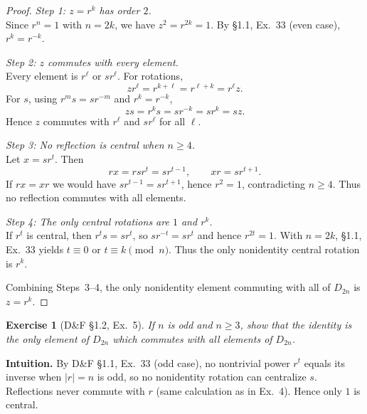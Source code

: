 \documentclass[12pt]{article}
\newtheorem{exercise}[theorem]{Exercise}
\theoremstyle{definition}
\begin{document}
\dotfill

\begin{proof}
\noindent\emph{Step 1: $z=r^{k}$ has order $2$.}\\

\noindent
Since $r^{n}=1$ with $n=2k$, we have $z^{2}=r^{2k}=1$. By §1.1, Ex.~33 (even case), $r^{k}=r^{-k}$.

\dotfill

\noindent\emph{Step 2: $z$ commutes with every element.}\\

\noindent
Every element is $r^{\ell}$ or $sr^{\ell}$. For rotations,
\[
zr^{\ell}=r^{k+\ell}=r^{\ell+k}=r^{\ell}z.
\]
For $s$, using $r^{m}s=sr^{-m}$ and $r^{k}=r^{-k}$,
\[
zs=r^{k}s=sr^{-k}=sr^{k}=sz.
\]
Hence $z$ commutes with $r^{\ell}$ and $sr^{\ell}$ for all $\ell$.

\dotfill

\noindent\emph{Step 3: No reflection is central when $n\ge 4$.}\\

\noindent
Let $x=sr^{t}$. Then
\[
rx=rsr^{t}=sr^{t-1},\qquad xr=sr^{t+1}.
\]
If $rx=xr$ we would have $sr^{t-1}=sr^{t+1}$, hence $r^{2}=1$, contradicting $n\ge4$.
Thus no reflection commutes with all elements.

\dotfill

\noindent\emph{Step 4: The only central rotations are $1$ and $r^{k}$.}\\

\noindent
If $r^{t}$ is central, then $r^{t}s=sr^{t}$, so $sr^{-t}=sr^{t}$ and hence $r^{2t}=1$.
With $n=2k$, §1.1, Ex.~33 yields $t\equiv0$ or $t\equiv k\pmod n$.
Thus the only nonidentity central rotation is $r^{k}$.

\dotfill

Combining Steps~3–4, the only nonidentity element commuting with all of $D_{2n}$ is $z=r^{k}$.
\end{proof}

\newpage

\begin{exercise}[D\&F §1.2, Ex.~5]
If $n$ is odd and $n\ge 3$, show that the identity is the only element of $D_{2n}$ which
commutes with all elements of $D_{2n}$.
\end{exercise}

\dotfill

\noindent
\textbf{Intuition.}
By D\&F §1.1, Ex.~33 (odd case), no nontrivial power $r^{t}$ equals its inverse when $|r|=n$ is odd,
so no nonidentity rotation can centralize $s$. Reflections never commute with $r$ (same calculation
as in Ex.~4). Hence only $1$ is central.
\end{document}
